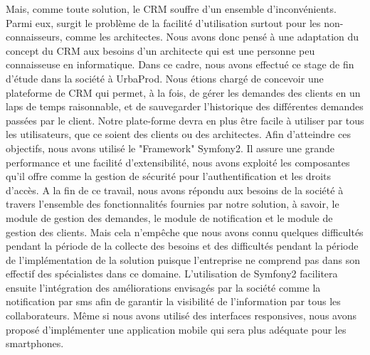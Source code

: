 \begin{spacing}{1.5}
Mais, comme toute solution, le CRM souffre d'un ensemble d'inconvénients. Parmi eux, surgit le problème de la facilité d'utilisation surtout pour les non-connaisseurs, comme les architectes. Nous avons donc pensé à une adaptation du concept du CRM aux besoins d'un architecte qui est une personne peu connaisseuse en informatique.
Dans ce cadre, nous avons effectué ce stage de fin d'étude dans la société à UrbaProd. Nous étions chargé de concevoir une plateforme de CRM qui permet, à la fois, de gérer les demandes des clients en un laps de temps raisonnable, et de sauvegarder l'historique des différentes demandes passées par le client. Notre plate-forme devra en plus être facile à utiliser par tous les utilisateurs, que ce soient des clients ou des architectes.
Afin d'atteindre ces objectifs, nous avons utilisé le "Framework" Symfony2. Il assure une grande performance et une facilité d'extensibilité, nous avons exploité les composantes qu'il offre comme la gestion de sécurité pour l'authentification et les droits d'accès.
A la fin de ce travail, nous avons répondu aux besoins de la société à travers l'ensemble des fonctionnalités fournies par notre solution, à savoir, le module de gestion des demandes, le module de notification et le module de gestion des clients.
Mais cela n'empêche que nous avons connu quelques difficultés pendant la période de la collecte des besoins et des difficultés pendant la période de l'implémentation de la solution puisque l'entreprise ne comprend pas dans son effectif des spécialistes dans ce domaine.
L'utilisation de Symfony2 facilitera ensuite l'intégration des améliorations envisagés par la société comme la notification par sms afin de garantir la visibilité de l'information par tous les collaborateurs. Même si nous avons utilisé des interfaces responsives, nous avons proposé d'implémenter une application mobile qui sera plus adéquate pour les smartphones.

\end{spacing} 